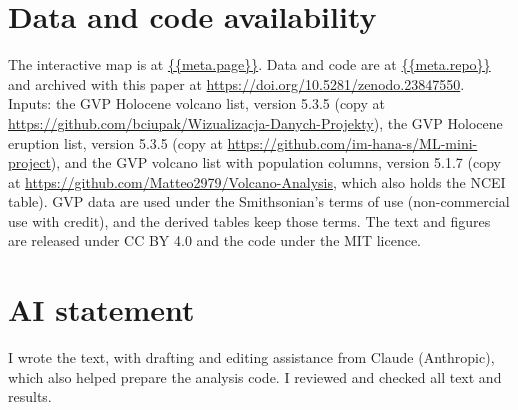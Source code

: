 \documentclass[11pt,a4paper]{article}
\begin{document}
\section*{Data and code availability}
The interactive map is at \url{{{meta.page}}}. Data and code are at \url{{{meta.repo}}} and archived with this paper at \url{https://doi.org/10.5281/zenodo.23847550}. Inputs: the GVP Holocene volcano list, version 5.3.5 (copy at \url{https://github.com/bciupak/Wizualizacja-Danych-Projekty}), the GVP Holocene eruption list, version 5.3.5 (copy at \url{https://github.com/im-hana-s/ML-mini-project}), and the GVP volcano list with population columns, version 5.1.7 (copy at \url{https://github.com/Matteo2979/Volcano-Analysis}, which also holds the NCEI table). GVP data are used under the Smithsonian's terms of use (non-commercial use with credit), and the derived tables keep those terms. The text and figures are released under CC BY 4.0 and the code under the MIT licence.

\section*{AI statement}
I wrote the text, with drafting and editing assistance from Claude (Anthropic), which also helped prepare the analysis code. I reviewed and checked all text and results.
\end{document}
